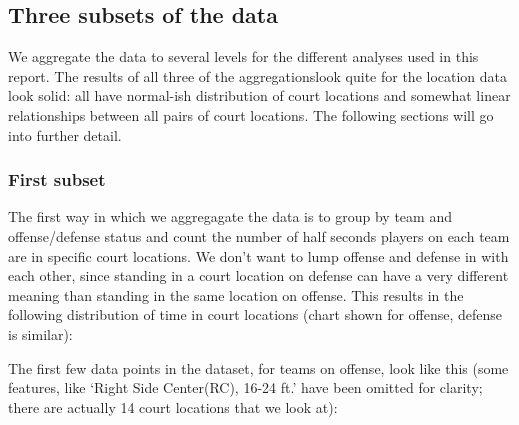 \documentclass[]{article}
\begin{document}
\hypertarget{three-subsets-of-the-data}{%
\subsection{Three subsets of the data}\label{three-subsets-of-the-data}}

We aggregate the data to several levels for the different analyses used
in this report. The results of all three of the aggregationslook quite
for the location data look solid: all have normal-ish distribution of
court locations and somewhat linear relationships between all pairs of
court locations. The following sections will go into further detail.

\hypertarget{first-subset}{%
\subsubsection{First subset}\label{first-subset}}

The first way in which we aggregagate the data is to group by team and
offense/defense status and count the number of half seconds players on
each team are in specific court locations. We don't want to lump offense
and defense in with each other, since standing in a court location on
defense can have a very different meaning than standing in the same
location on offense. This results in the following distribution of time
in court locations (chart shown for offense, defense is similar):

The first few data points in the dataset, for teams on offense, look
like this (some features, like `Right Side Center(RC), 16-24 ft.' have
been omitted for clarity; there are actually 14 court locations that we
look at):
\end{document}
